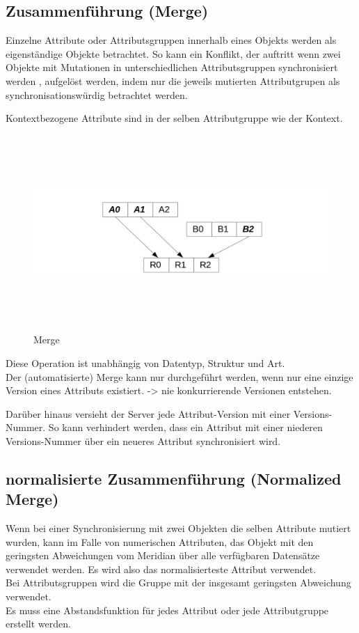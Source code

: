 \documentclass[oneside,11pt,parskip=half,ngerman]{scrreprt}
\makeatletter
\def\maxwidth{\ifdim\Gin@nat@width>\linewidth\linewidth
\else\Gin@nat@width\fi}
\let\Oldincludegraphics\includegraphics
\renewcommand{\includegraphics}[1]{\Oldincludegraphics[width=\maxwidth,height=20em,keepaspectratio]{#1}}
\makeatother
\begin{document}
\subsection{Zusammenführung (Merge)}\label{zusammenfuxfchrung-merge}

Einzelne Attribute oder Attributsgruppen innerhalb eines Objekts werden
als eigenständige Objekte betrachtet. So kann ein Konflikt, der auftritt
wenn zwei Objekte mit Mutationen in unterschiedlichen Attributsgruppen
synchronisiert werden , aufgelöst werden, indem nur die jeweils
mutierten Attributgrupen als synchronisationswürdig betrachtet werden.

Kontextbezogene Attribute sind in der selben Attributgruppe wie der
Kontext.

\begin{figure}[htbp]
\centering
\includegraphics{./img/merge.jpg}
\caption{Merge}
\end{figure}

Diese Operation ist unabhängig von Datentyp, Struktur und Art.\\Der
(automatisierte) Merge kann nur durchgeführt werden, wenn nur eine
einzige Version eines Attributs existiert. -\textgreater{} nie
konkurrierende Versionen entstehen.

Darüber hinaus versieht der Server jede Attribut-Version mit einer
Versions-Nummer. So kann verhindert werden, dass ein Attribut mit einer
niederen Versions-Nummer über ein neueres Attribut synchronisiert wird.

\subsection{normalisierte Zusammenführung (Normalized
Merge)}\label{normalisierte-zusammenfuxfchrung-normalized-merge}

Wenn bei einer Synchronisierung mit zwei Objekten die selben Attribute
mutiert wurden, kann im Falle von numerischen Attributen, das Objekt mit
den geringsten Abweichungen vom Meridian über alle verfügbaren
Datensätze verwendet werden. Es wird also das normalisierteste Attribut
verwendet.\\Bei Attributsgruppen wird die Gruppe mit der insgesamt
geringsten Abweichung verwendet.\\Es muss eine Abstandsfunktion für
jedes Attribut oder jede Attributgruppe erstellt werden.
\end{document}
